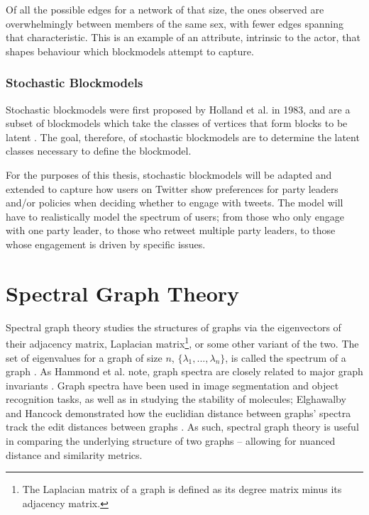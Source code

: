 Of all the possible edges for a network of that size, the ones observed are
overwhelmingly between members of the same sex, with fewer edges spanning that
characteristic. This is an example of an attribute, intrinsic to the actor, that
shapes behaviour which blockmodels attempt to capture. 

\subsubsection{Stochastic Blockmodels}

Stochastic blockmodels were first proposed by Holland et al. in 1983, and are a
subset of blockmodels which take the classes of vertices that form blocks to be
latent \cite{holland1983stochastic}. The goal, therefore, of stochastic
blockmodels are to determine the latent classes necessary to define the
blockmodel. 

For the purposes of this thesis, stochastic blockmodels will be adapted and
extended to capture how users on Twitter show preferences for party leaders
and/or policies when deciding whether to engage with tweets. The model will have
to realistically model the spectrum of users; from those who only engage with
one party leader, to those who retweet multiple party leaders, to those whose
engagement is driven by specific issues. 

\section{Spectral Graph Theory}\label{sec:spectralGraphTheory}

Spectral graph theory studies the structures of graphs via the eigenvectors of
their adjacency matrix, Laplacian matrix\footnote{The Laplacian matrix of a
graph is defined as its degree matrix minus its adjacency matrix.}, or some
other variant of the two. The set of eigenvalues for a graph of size $n$,
$\{\lambda_{1},...,\lambda_{n}\}$, is called the spectrum of a graph
\cite{netlsd}. As Hammond et al. note, graph spectra are closely related to
major graph invariants \cite{chung1997spectral}. Graph spectra have been used in
image segmentation and object recognition tasks, as well as in studying the
stability of molecules; Elghawalby and Hancock demonstrated how the euclidian
distance between graphs' spectra track the edit distances between graphs
\cite{elghawalby2008measuring,chung1997spectral}. As such, spectral graph theory
is useful in comparing the underlying structure of two graphs -- allowing for
nuanced distance and similarity metrics.   

